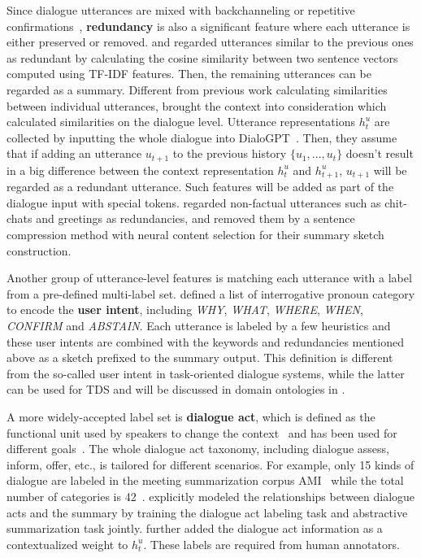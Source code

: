 Since dialogue utterances are mixed with backchanneling or repetitive confirmations~\cite{sacks1978simplest}, \textbf{redundancy} is also a significant 
feature where each utterance is either preserved or removed. 
\citet{murray2005extractive} and \citet{zechner2002automatic} regarded 
utterances similar to the previous ones as redundant by calculating 
the cosine similarity between two sentence vectors 
computed using TF-IDF features. {Then, the remaining utterances can be regarded as a summary}.
Different from previous work calculating similarities between individual utterances,
\citet{feng2021language} brought the context into consideration which calculated similarities on the dialogue level.
Utterance representations $h_t^u$ are collected by inputting the whole dialogue into DialoGPT~\cite{zhang2020dialogpt}. 
Then, they assume that if adding an utterance $u_{t+1}$ to the 
previous history $\{u_1, ..., u_t\}$ doesn't result in a big difference 
between the context representation $h_t^u$ and $h_{t+1}^u$, 
$u_{t+1}$ will be regarded as a redundant utterance. 
Such features will be added as part of the dialogue input with special tokens. 
\citet{wu2021controllable} regarded non-factual utterances 
such as chit-chats and greetings as redundancies, and removed them by a sentence compression method with neural content selection for their summary sketch construction.

Another group of utterance-level features is matching each utterance with 
a label from a pre-defined multi-label set. \citet{wu2021controllable} defined 
a list of interrogative pronoun category to encode the \textbf{user intent}, including \textit{WHY}, \textit{WHAT}, \textit{WHERE}, 
\textit{WHEN}, \textit{CONFIRM} and \textit{ABSTAIN}. 
Each utterance is labeled by a few heuristics and these user intents are combined with the keywords and redundancies mentioned above as a sketch prefixed to the summary output.
This definition is different from the so-called user intent in task-oriented dialogue systems, while the latter can be used for TDS and will be discussed in domain ontologies in .

A more widely-accepted label set is \textbf{dialogue act}, which is defined as the functional unit used by speakers to change the context~\cite{bunt1994context} and has been used for different goals~\cite{kumar2018dialogue, oraby2017may}. The whole dialogue act taxonomy, including dialogue assess, inform, offer, etc., is tailored for different scenarios. For example, only 15 kinds of dialogue are labeled in the meeting summarization corpus AMI~\cite{carletta2005ami} 
while the total number of categories is 42~\cite{stolcke2000dialogue}. \citet{goo2018abstractive} explicitly modeled the relationships between dialogue acts 
and the summary by training the dialogue act labeling task and 
abstractive summarization task jointly. 
\citet{di2020da} further added the dialogue act information as a contextualized 
weight to $h_t^u$. These labels are required from human annotators. 


